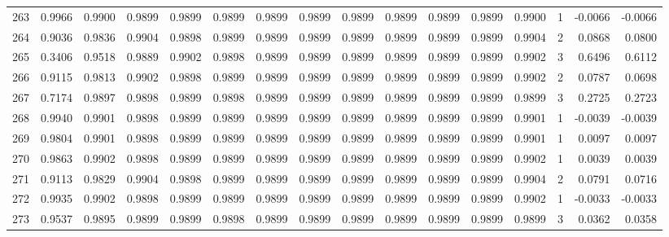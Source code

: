 \begin{tabular}{lrrrrrrrrrrrrrrr}
263 &      0.9966 &  0.9900 &  0.9899 &  0.9899 &  0.9899 &  0.9899 &  0.9899 &  0.9899 &  0.9899 &  0.9899 &   0.9899 &     0.9900 &      1 &                   -0.0066 &                    -0.0066 \\
264 &      0.9036 &  0.9836 &  0.9904 &  0.9898 &  0.9899 &  0.9899 &  0.9899 &  0.9899 &  0.9899 &  0.9899 &   0.9899 &     0.9904 &      2 &                    0.0868 &                     0.0800 \\
265 &      0.3406 &  0.9518 &  0.9889 &  0.9902 &  0.9898 &  0.9899 &  0.9899 &  0.9899 &  0.9899 &  0.9899 &   0.9899 &     0.9902 &      3 &                    0.6496 &                     0.6112 \\
266 &      0.9115 &  0.9813 &  0.9902 &  0.9898 &  0.9899 &  0.9899 &  0.9899 &  0.9899 &  0.9899 &  0.9899 &   0.9899 &     0.9902 &      2 &                    0.0787 &                     0.0698 \\
267 &      0.7174 &  0.9897 &  0.9898 &  0.9899 &  0.9898 &  0.9899 &  0.9899 &  0.9899 &  0.9899 &  0.9899 &   0.9899 &     0.9899 &      3 &                    0.2725 &                     0.2723 \\
268 &      0.9940 &  0.9901 &  0.9898 &  0.9899 &  0.9899 &  0.9899 &  0.9899 &  0.9899 &  0.9899 &  0.9899 &   0.9899 &     0.9901 &      1 &                   -0.0039 &                    -0.0039 \\
269 &      0.9804 &  0.9901 &  0.9898 &  0.9899 &  0.9899 &  0.9899 &  0.9899 &  0.9899 &  0.9899 &  0.9899 &   0.9899 &     0.9901 &      1 &                    0.0097 &                     0.0097 \\
270 &      0.9863 &  0.9902 &  0.9898 &  0.9899 &  0.9899 &  0.9899 &  0.9899 &  0.9899 &  0.9899 &  0.9899 &   0.9899 &     0.9902 &      1 &                    0.0039 &                     0.0039 \\
271 &      0.9113 &  0.9829 &  0.9904 &  0.9898 &  0.9899 &  0.9899 &  0.9899 &  0.9899 &  0.9899 &  0.9899 &   0.9899 &     0.9904 &      2 &                    0.0791 &                     0.0716 \\
272 &      0.9935 &  0.9902 &  0.9898 &  0.9899 &  0.9899 &  0.9899 &  0.9899 &  0.9899 &  0.9899 &  0.9899 &   0.9899 &     0.9902 &      1 &                   -0.0033 &                    -0.0033 \\
273 &      0.9537 &  0.9895 &  0.9899 &  0.9899 &  0.9898 &  0.9899 &  0.9899 &  0.9899 &  0.9899 &  0.9899 &   0.9899 &     0.9899 &      3 &                    0.0362 &                     0.0358 \\

\end{tabular}
